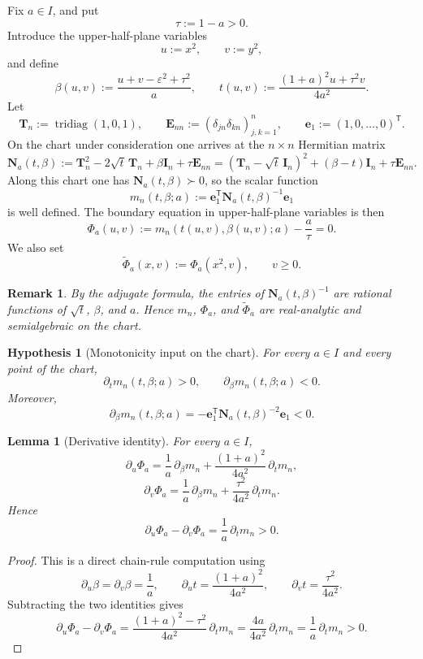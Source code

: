 \documentclass[11pt]{article}
\newtheorem{lemma}[theorem]{Lemma}
\newtheorem{remark}[theorem]{Remark}
\newtheorem{hypothesis}[theorem]{Hypothesis}
\DeclareMathOperator{\tridiag}{tridiag}
\begin{document}
Fix \(a\in I\), and put
\[
\tau:=1-a>0.
\]
Introduce the upper-half-plane variables
\[
u:=x^2,\qquad v:=y^2,
\]
and define
\[
\beta(u,v):=\frac{u+v-\varepsilon^2+\tau^2}{a},
\qquad
t(u,v):=\frac{(1+a)^2u+\tau^2v}{4a^2}.
\]
Let
\[
\mathbf T_n:=\tridiag(1,0,1),
\qquad
\mathbf E_{nn}:=(\delta_{jn}\delta_{kn})_{j,k=1}^n,
\qquad
\mathbf e_1:=(1,0,\dots,0)^{\mathsf T}.
\]
On the chart under consideration one arrives at the \(n\times n\) Hermitian matrix
\[
\mathbf N_a(t,\beta)
:=
\mathbf T_n^2-2\sqrt t\,\mathbf T_n+\beta\mathbf I_n+\tau\mathbf E_{nn}
=
(\mathbf T_n-\sqrt t\,\mathbf I_n)^2+(\beta-t)\mathbf I_n+\tau\mathbf E_{nn}.
\]
Along this chart one has \(\mathbf N_a(t,\beta)\succ 0\), so the scalar function
\[
m_n(t,\beta;a)
:=
\mathbf e_1^{\mathsf T}\mathbf N_a(t,\beta)^{-1}\mathbf e_1
\]
is well defined. The boundary equation in upper-half-plane variables is then
\[
\Phi_a(u,v)
:=
m_n(t(u,v),\beta(u,v);a)-\frac{a}{\tau}
=
0.
\]
We also set
\[
\widetilde\Phi_a(x,v):=\Phi_a(x^2,v),
\qquad v\ge 0.
\]

\begin{remark}\label{rem:rational}
By the adjugate formula, the entries of \(\mathbf N_a(t,\beta)^{-1}\) are rational functions of \(\sqrt t\), \(\beta\), and \(a\). Hence \(m_n\), \(\Phi_a\), and \(\widetilde\Phi_a\) are real-analytic and semialgebraic on the chart.
\end{remark}

\begin{hypothesis}[Monotonicity input on the chart]\label{hyp:monotone-m}
For every \(a\in I\) and every point of the chart,
\[
\partial_t m_n(t,\beta;a)>0,
\qquad
\partial_\beta m_n(t,\beta;a)<0.
\]
Moreover,
\[
\partial_\beta m_n(t,\beta;a)
=
-\mathbf e_1^{\mathsf T}\mathbf N_a(t,\beta)^{-2}\mathbf e_1<0.
\]
\end{hypothesis}

\begin{lemma}[Derivative identity]\label{lem:derivative-identity}
For every \(a\in I\),
\[
\partial_u\Phi_a
=
\frac1a\,\partial_\beta m_n
+
\frac{(1+a)^2}{4a^2}\,\partial_t m_n,
\]
\[
\partial_v\Phi_a
=
\frac1a\,\partial_\beta m_n
+
\frac{\tau^2}{4a^2}\,\partial_t m_n.
\]
Hence
\[
\partial_u\Phi_a-\partial_v\Phi_a
=
\frac1a\,\partial_t m_n
>0.
\]
\end{lemma}

\begin{proof}
This is a direct chain-rule computation using
\[
\partial_u\beta=\partial_v\beta=\frac1a,
\qquad
\partial_u t=\frac{(1+a)^2}{4a^2},
\qquad
\partial_v t=\frac{\tau^2}{4a^2}.
\]
Subtracting the two identities gives
\[
\partial_u\Phi_a-\partial_v\Phi_a
=
\frac{(1+a)^2-\tau^2}{4a^2}\,\partial_t m_n
=
\frac{4a}{4a^2}\,\partial_t m_n
=
\frac1a\,\partial_t m_n>0.
\]
\end{proof}
\end{document}
